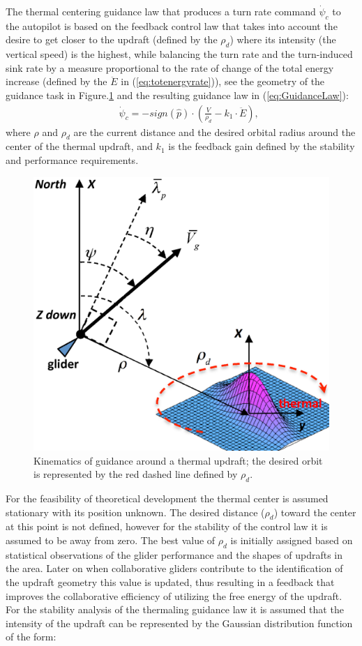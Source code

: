 \documentclass{ifacconf}
\begin{document}
The thermal centering guidance law that produces a turn rate command $\dot{\psi}_{c}$ to the autopilot is based on the feedback control law that takes into account the desire to get closer to the updraft (defined by the $\rho_d$) where its intensity (the vertical speed) is the highest, while balancing the turn rate and the turn-induced sink rate by a measure proportional to the rate of change of the total energy increase (defined by the $\ddot{E}$ in (\ref{eq:totenergyrate})), see the geometry of the guidance task in Figure.\ref{fig:ThermaG} and the resulting guidance law in (\ref{eq:GuidanceLaw}):
\begin{eqnarray}
    && \dot{\psi}_{c}=-sign(\hat{p}) \cdot (\frac{V}{\rho_d}-k_1 \cdot \ddot{E}),
    \label{eq:GuidanceLaw}
\end{eqnarray}
where $\rho$ and $\rho_d$ are the current distance and the desired orbital radius around the center of the thermal updraft, and $k_1$ is the feedback gain defined by the stability and performance requirements.
\begin{figure}[thpb]
  \centering
  \includegraphics[scale=0.4]{Figures/ThermalG.eps}
  \caption{Kinematics of guidance around a thermal updraft; the desired orbit is represented by the red dashed line defined by $\rho_d$.}
  \label{fig:ThermaG}
\end{figure}
For the feasibility of theoretical development the thermal center is assumed stationary with its position unknown. The desired distance ($\rho_d$) toward the center at this point is not defined, however for the stability of the control law it is assumed to be away from zero. The best value of $\rho_d$ is initially assigned based on statistical observations of the glider performance and the shapes of updrafts in the area. Later on when collaborative gliders contribute to the identification of the updraft geometry this value is updated, thus resulting in a feedback that improves the collaborative efficiency of utilizing the free energy of the updraft. For the stability analysis of the thermaling guidance law it is assumed that the intensity of the updraft can be represented by the Gaussian distribution function of the form:
\end{document}
